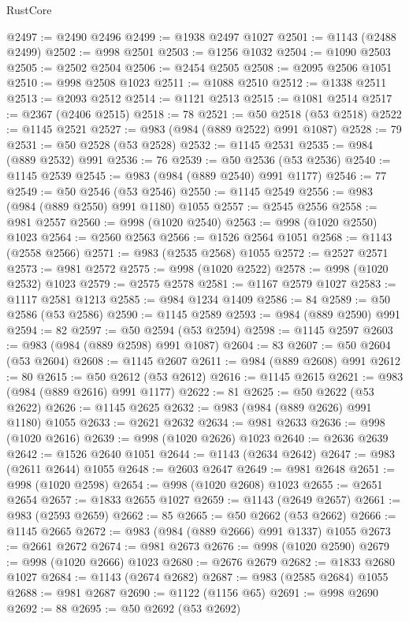 \begin{lexlean}{RustCore}
\begin{coremodule}
@2497 := @2490 @2496
@2499 := @1938 @2497 @1027
@2501 := @1143 (@2488 @2499)
@2502 := @998 @2501
@2503 := @1256 @1032
@2504 := @1090 @2503
@2505 := @2502 @2504
@2506 := @2454 @2505
@2508 := @2095 @2506 @1051
@2510 := @998 @2508 @1023
@2511 := @1088 @2510
@2512 := @1338 @2511
@2513 := @2093 @2512
@2514 := @1121 @2513
@2515 := @1081 @2514
@2517 := @2367 (@2406 @2515)
@2518 := 78
@2521 := @50 @2518 (@53 @2518)
@2522 := @1145 @2521
@2527 := @983 (@984 (@889 @2522) @991 @1087)
@2528 := 79
@2531 := @50 @2528 (@53 @2528)
@2532 := @1145 @2531
@2535 := @984 (@889 @2532) @991
@2536 := 76
@2539 := @50 @2536 (@53 @2536)
@2540 := @1145 @2539
@2545 := @983 (@984 (@889 @2540) @991 @1177)
@2546 := 77
@2549 := @50 @2546 (@53 @2546)
@2550 := @1145 @2549
@2556 := @983 (@984 (@889 @2550) @991 @1180) @1055
@2557 := @2545 @2556
@2558 := @981 @2557
@2560 := @998 (@1020 @2540)
@2563 := @998 (@1020 @2550) @1023
@2564 := @2560 @2563
@2566 := @1526 @2564 @1051
@2568 := @1143 (@2558 @2566)
@2571 := @983 (@2535 @2568) @1055
@2572 := @2527 @2571
@2573 := @981 @2572
@2575 := @998 (@1020 @2522)
@2578 := @998 (@1020 @2532) @1023
@2579 := @2575 @2578
@2581 := @1167 @2579 @1027
@2583 := @1117 @2581 @1213
@2585 := @984 @1234 @1409
@2586 := 84
@2589 := @50 @2586 (@53 @2586)
@2590 := @1145 @2589
@2593 := @984 (@889 @2590) @991
@2594 := 82
@2597 := @50 @2594 (@53 @2594)
@2598 := @1145 @2597
@2603 := @983 (@984 (@889 @2598) @991 @1087)
@2604 := 83
@2607 := @50 @2604 (@53 @2604)
@2608 := @1145 @2607
@2611 := @984 (@889 @2608) @991
@2612 := 80
@2615 := @50 @2612 (@53 @2612)
@2616 := @1145 @2615
@2621 := @983 (@984 (@889 @2616) @991 @1177)
@2622 := 81
@2625 := @50 @2622 (@53 @2622)
@2626 := @1145 @2625
@2632 := @983 (@984 (@889 @2626) @991 @1180) @1055
@2633 := @2621 @2632
@2634 := @981 @2633
@2636 := @998 (@1020 @2616)
@2639 := @998 (@1020 @2626) @1023
@2640 := @2636 @2639
@2642 := @1526 @2640 @1051
@2644 := @1143 (@2634 @2642)
@2647 := @983 (@2611 @2644) @1055
@2648 := @2603 @2647
@2649 := @981 @2648
@2651 := @998 (@1020 @2598)
@2654 := @998 (@1020 @2608) @1023
@2655 := @2651 @2654
@2657 := @1833 @2655 @1027
@2659 := @1143 (@2649 @2657)
@2661 := @983 (@2593 @2659)
@2662 := 85
@2665 := @50 @2662 (@53 @2662)
@2666 := @1145 @2665
@2672 := @983 (@984 (@889 @2666) @991 @1337) @1055
@2673 := @2661 @2672
@2674 := @981 @2673
@2676 := @998 (@1020 @2590)
@2679 := @998 (@1020 @2666) @1023
@2680 := @2676 @2679
@2682 := @1833 @2680 @1027
@2684 := @1143 (@2674 @2682)
@2687 := @983 (@2585 @2684) @1055
@2688 := @981 @2687
@2690 := @1122 (@1156 @65)
@2691 := @998 @2690
@2692 := 88
@2695 := @50 @2692 (@53 @2692)

\end{coremodule}
\end{lexlean}
